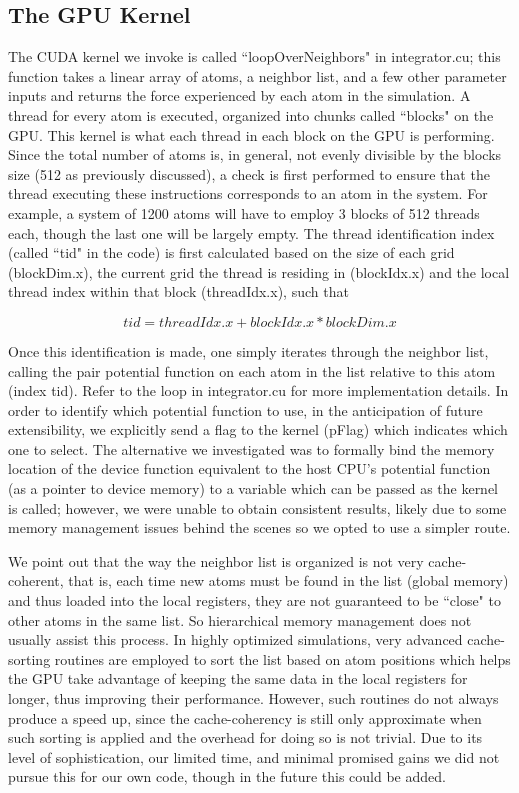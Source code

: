 \documentclass[12pt]{article}
\begin{document}
\subsection{The GPU Kernel}
\label{sec:gpukernel}
The CUDA kernel we invoke is called ``loopOverNeighbors" in integrator.cu; this function takes a linear array of atoms, a neighbor list, and 
a few other parameter inputs and returns the force experienced by each atom in the simulation.  A thread for every atom is executed, organized into chunks called ``blocks" on the GPU.   This kernel is what each thread in each block  on the GPU is performing.   Since the total number of atoms is, in general, not evenly divisible by the blocks size (512 as previously discussed), a check is first performed to ensure that the thread executing these instructions corresponds to an atom in the system.  For example, a system of 1200 atoms will have to employ 3 blocks of 512 threads each, though the last one will be largely empty.  The thread identification index (called ``tid" in the code) is first calculated based on the size of each grid (blockDim.x), the current grid the thread is residing in (blockIdx.x) and the local thread index within that block (threadIdx.x), such that

\begin{equation}
	tid = threadIdx.x + blockIdx.x*blockDim.x
\end{equation}

Once this identification is made, one simply iterates through the neighbor list, calling the pair potential function on each atom in the list relative to this atom (index tid).  Refer to the loop in integrator.cu for more implementation details.  In order to identify which potential function to use, in the anticipation of future extensibility, we explicitly send a flag to the kernel (pFlag) which indicates which one to select.  The alternative we investigated was to formally bind the memory location of the device function equivalent to the host CPU's potential function (as a pointer to device memory) to a variable which can be passed as the kernel is called; however, we were unable to obtain consistent results, likely due to some memory management issues behind the scenes so we opted to use a simpler route.

We point out that the way the neighbor list is organized is not very cache-coherent, that is, each time new atoms must be found in the list (global memory) and thus loaded into the local registers, they are not guaranteed to be ``close" to other atoms in the same list.  So hierarchical memory management does not usually assist this process.  In highly optimized simulations, very advanced cache-sorting routines are employed to sort the list based on atom positions which helps the GPU take advantage of keeping the same data in the local registers for longer, thus improving their performance.  However, such routines do not always produce a speed up, since the cache-coherency is still only approximate when such sorting is applied and the overhead for doing so is not trivial.  Due to its level of sophistication, our limited time,  and minimal promised gains we did not pursue this for our own code, though in the future this could be added.
\end{document}
